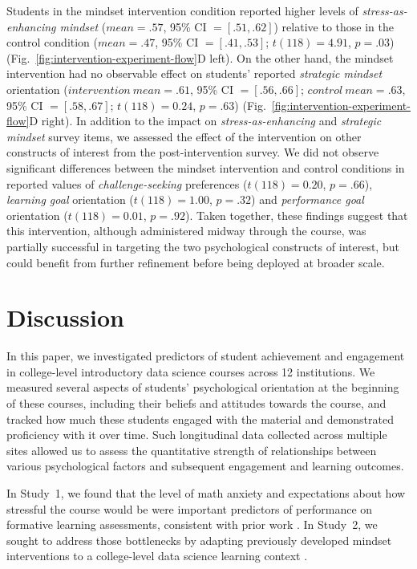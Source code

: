 \documentclass[10pt,letterpaper]{article}
\begin{document}
Students in the mindset intervention condition reported higher levels of 
\textit{stress-as-enhancing mindset} ($mean=.57$, 95\% CI $=[.51, .62]$) relative to those in the control condition ($mean=.47$, 95\% CI $=[.41, .53]$; $t(118)=4.91$, $p=.03$) 
(Fig.~\ref{fig:intervention-experiment-flow}D left).
On the other hand, the mindset intervention had no observable effect on students' reported \textit{strategic mindset} orientation ($intervention\ mean=.61$, 95\% CI $=[.56, .66]$; $control\ mean=.63$, 95\% CI $=[.58, .67]$; $t(118)=0.24$, $p=.63$) (Fig.~\ref{fig:intervention-experiment-flow}D right).
In addition to the impact on \textit{stress-as-enhancing} and \textit{strategic mindset} survey items, we assessed the effect of the intervention on other constructs of interest from the post-intervention survey.
We did not observe significant differences between the mindset intervention and control conditions in reported values of \textit{challenge-seeking} preferences ($t(118)=0.20$, $p=.66$), \textit{learning goal} orientation ($t(118)=1.00$, $p=.32$) and \textit{performance goal} orientation ($t(118)=0.01$, $p=.92$).
Taken together, these findings suggest that this intervention, although administered midway through the course,  was partially successful in targeting the two psychological constructs of interest, but could benefit from further refinement before being deployed at broader scale.  

\section{Discussion}
In this paper, we investigated predictors of student achievement and engagement in college-level introductory data science courses across 12 institutions.
We measured several aspects of students' psychological orientation at the beginning of these courses, including their beliefs and attitudes towards the course, and tracked how much these students engaged with the material and demonstrated proficiency with it over time. 
Such longitudinal data collected across multiple sites allowed us to assess the quantitative strength of relationships between various psychological factors and subsequent engagement and learning outcomes.

In Study~1, we found that the level of math anxiety and expectations about how stressful the course would be were important predictors of performance on formative learning assessments, consistent with prior work \cite{foley2017math, chang2016math}. 
In Study~2, we sought to address those bottlenecks by adapting previously developed mindset interventions to a college-level data science learning context \cite{yeager2022synergistic, Chen2020strategic}.
\end{document}
